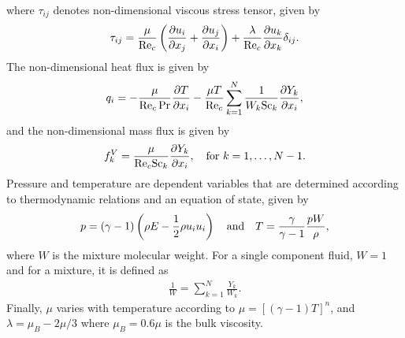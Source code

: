 \documentclass[12pt]{article}
\newcommand{\Rec}{\mbox{\rm Re}_c} %
\newcommand{\Sc}{\mbox{\rm Sc}} %
\begin{document}
where $\tau_{ij}$ denotes  non-dimensional viscous stress tensor, given by
\begin{align}\label{tau}
\tau_{ij}=\frac{\mu}{\Rec}\left(\frac{\partial u_i}{\partial x_j}+\frac{\partial u_j}{\partial x_i}\right)+\frac{\lambda}{\Rec}\frac{\partial u_k}{\partial x_k}\delta _{ij}.
\end{align}
The non-dimensional heat flux is given by
\begin{align}\label{q}
q_i=-\frac{\mu}{\Rec \Pr}\frac{\partial T}{\partial x_i} - \frac{\mu T}{\Rec}\sum \limits_{k=1}^N \frac{1}{W_k \Sc_k}\frac{\partial Y_k}{\partial x_i},
\end{align}
and the non-dimensional mass flux is given by
\begin{align}\label{f^V_n}
f^V_k=\frac{\mu}{\Rec \Sc_k}\frac{\partial Y_k}{\partial x_i}, \quad \text{for} \ k = 1, \dots, N-1.
\end{align}
Pressure and temperature are dependent variables that are determined according to thermodynamic relations and an equation of state, given by
\begin{align}\label{p_T}
p =  \left(\gamma -1\right) \left( \rho E - \frac{1}{2}\rho u_i u_i \right)\quad{\rm and}\quad
T = \frac{\gamma}{\gamma-1 } \frac{p W}{\rho},
\end{align}
where $W$ is the mixture molecular weight. For a single component fluid, $W=1$ and for a mixture, it is defined as
\begin{align}\label{W}
\frac{1}{W} = \sum \limits_{k=1}^N \frac{Y_k}{W_k}.
\end{align}
Finally, $\mu$ varies with temperature according to $\mu = [(\gamma -1)T]^n $, and $ \lambda=\mu _B - 2\mu/3$  where $ \mu _B = 0.6 \mu $  is the bulk viscosity.
\end{document}
